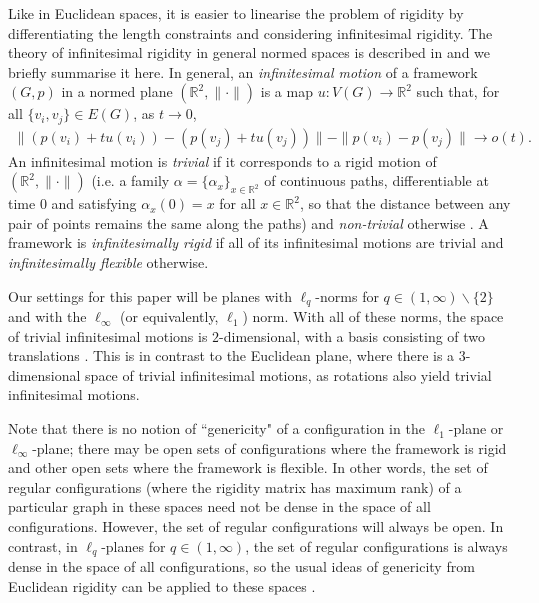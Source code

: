 \documentclass[reqno,a4paper,10pt]{article}
\theoremstyle{definition}
\theoremstyle{remark}
\numberwithin{equation}{section}
\numberwithin{figure}{section}
\numberwithin{table}{section}
\newcommand{\R}{\mathbb{R}}
\begin{document}
    Like in Euclidean spaces, it is easier to linearise the problem of rigidity by differentiating the length constraints and considering infinitesimal rigidity. The theory of infinitesimal rigidity in general normed spaces is described in \cite{NonEuclidean} and we briefly summarise it here. In general, an \emph{infinitesimal motion} of a framework $(G,p)$ in a normed plane $(\R^2,\|\cdot\|)$ is a map $u:V(G)\to\R^2$ such that, for all $\{v_i,v_j\}\in E(G)$, as $t\to0$,
    \begin{align*}
        \|(p(v_i)+tu(v_i))-(p(v_j)+tu(v_j))\|-\|p(v_i)-p(v_j)\|\to o(t).
    \end{align*}
    An infinitesimal motion is \emph{trivial} if it corresponds to a rigid  motion of $(\R^2,\|\cdot\|)$ (i.e. a family 
    $\alpha=\{\alpha_x\}_{x\in\mathbb{R}^2}$ 
    of continuous paths, differentiable at time 0 and satisfying $\alpha_x(0)=x$ for all $x\in \mathbb{R}^2$, so that the distance between any pair of points remains the same along the paths) 
    and \emph{non-trivial} otherwise \cite[Definition 2.2]{NonEuclidean}. A framework is \emph{infinitesimally rigid} if all of its infinitesimal motions are trivial and \emph{infinitesimally flexible} otherwise.

    Our settings for this paper will be planes with $\ell_q$-norms for $q\in(1,\infty)\backslash\{2\}$ and with the $\ell_\infty$ (or equivalently, $\ell_1$) norm. With all of these norms, the space of trivial infinitesimal motions is $2$-dimensional, with a basis consisting of two translations \cite{NonEuclidean}. This is in contrast to the Euclidean plane, where there is a $3$-dimensional space of trivial infinitesimal motions, as rotations also yield trivial infinitesimal motions.
    
    Note that  there is no notion of ``genericity" of a configuration in the $\ell_1$-plane or $\ell_\infty$-plane; there may be open sets of configurations where the framework is rigid and other open sets where the framework is flexible. In other words, the set of regular configurations (where the rigidity matrix has maximum rank) of a particular graph in these spaces need not be dense in the space of all configurations. However, the set of regular configurations will always be open. In contrast, in $\ell_q$-planes for $q\in(1,\infty)$, the set of regular configurations is always dense in the space of all configurations, so the usual ideas of genericity from Euclidean rigidity can be applied to these spaces \cite{KitsonDenseOpen}.
\end{document}

